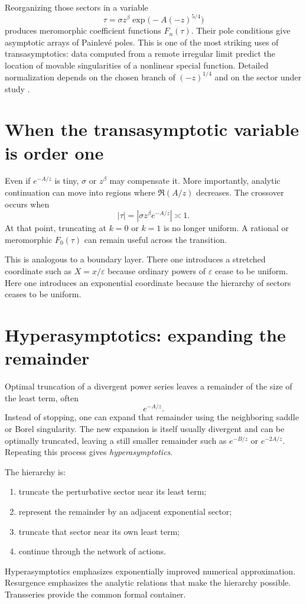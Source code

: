 \documentclass[11pt,openany]{book}
\theoremstyle{definition}
\theoremstyle{plain}
\theoremstyle{remark}
\newcommand{\eps}{\varepsilon}
\begin{document}
Reorganizing those sectors in a variable
\[
 \tau=\sigma z^\beta
 \exp\bigl(-A(-z)^{5/4}\bigr)
\]
produces meromorphic coefficient functions $F_n(\tau)$. Their pole conditions give asymptotic arrays of Painlev\'e poles. This is one of the most striking uses of transasymptotics: data computed from a remote irregular limit predict the location of movable singularities of a nonlinear special function. Detailed normalization depends on the chosen branch of $(-z)^{1/4}$ and on the sector under study \cite{olde-daalhuis,costin-book}.

\section{When the transasymptotic variable is order one}

Even if $e^{-A/z}$ is tiny, $\sigma$ or $z^\beta$ may compensate it. More importantly, analytic continuation can move into regions where $\Re(A/z)$ decreases. The crossover occurs when
\begin{equation}\label{eq:tau-order-one}
 |\tau|=|\sigma z^\beta e^{-A/z}|\asymp1.
\end{equation}
At that point, truncating at $k=0$ or $k=1$ is no longer uniform. A rational or meromorphic $F_0(\tau)$ can remain useful across the transition.

This is analogous to a boundary layer. There one introduces a stretched coordinate such as $X=x/\eps$ because ordinary powers of $\eps$ cease to be uniform. Here one introduces an exponential coordinate because the hierarchy of sectors ceases to be uniform.

\section{Hyperasymptotics: expanding the remainder}

Optimal truncation of a divergent power series leaves a remainder of the size of the least term, often
\[
 e^{-A/z}.
\]
Instead of stopping, one can expand that remainder using the neighboring saddle or Borel singularity. The new expansion is itself usually divergent and can be optimally truncated, leaving a still smaller remainder such as $e^{-B/z}$ or $e^{-2A/z}$. Repeating this process gives \emph{hyperasymptotics}.

The hierarchy is:
\begin{enumerate}
 \item truncate the perturbative sector near its least term;
 \item represent the remainder by an adjacent exponential sector;
 \item truncate that sector near its own least term;
 \item continue through the network of actions.
\end{enumerate}
Hyperasymptotics emphasizes exponentially improved numerical approximation. Resurgence emphasizes the analytic relations that make the hierarchy possible. Transseries provide the common formal container.
\end{document}
